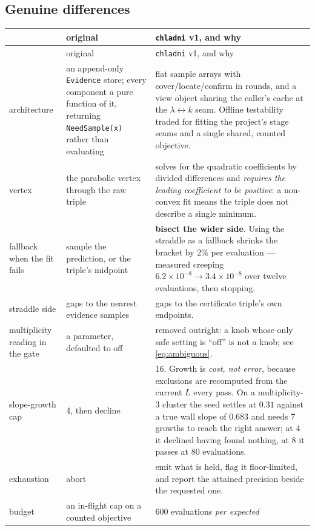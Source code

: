 \documentclass[11pt]{article}
\theoremstyle{definition}
\theoremstyle{remark}
\newcommand{\code}[1]{\texttt{#1}}
\newcommand{\lam}{\lambda}
\begin{document}
\subsection{Genuine differences}

\begin{longtable}{P{0.17\textwidth}P{0.29\textwidth}P{0.42\textwidth}}
\toprule
& original & \code{chladni} v1, and why\\
\midrule
\endfirsthead
\toprule
& original & \code{chladni} v1, and why\\
\midrule
\endhead
architecture & an append-only \code{Evidence} store; every component a pure function of it,
returning \code{NeedSample(x)} rather than evaluating &
flat sample arrays with cover/locate/confirm in rounds, and a view object sharing the caller's
cache at the $\lam\leftrightarrow k$ seam. Offline testability traded for fitting the
project's stage seams and a single shared, counted objective.\\[2pt]
vertex & the parabolic vertex through the raw triple &
solves for the quadratic coefficients by divided differences and \emph{requires the leading
coefficient to be positive}: a non-convex fit means the triple does not describe a single
minimum.\\[2pt]
fallback when the fit fails & sample the prediction, or the triple's midpoint &
\textbf{bisect the wider side}. Using the straddle as a fallback shrinks the bracket by 2\% per
evaluation --- measured creeping $6.2\times10^{-8}\to3.4\times10^{-8}$ over twelve evaluations,
then stopping.\\[2pt]
straddle side & gaps to the nearest evidence samples & gaps to the certificate triple's own
endpoints.\\[2pt]
multiplicity reading in the gate & a parameter, defaulted to off & removed outright: a knob
whose only safe setting is ``off'' is not a knob; see \eqref{eq:ambiguous}.\\[2pt]
slope-growth cap & 4, then decline & 16. Growth is \emph{cost, not error}, because exclusions
are recomputed from the current $L$ every pass. On a multiplicity-3 cluster the seed settles at
$0.31$ against a true wall slope of $0.683$ and needs 7 growths to reach the right answer; at 4
it declined having found nothing, at 8 it passes at 80 evaluations.\\[2pt]
exhaustion & abort & emit what is held, flag it floor-limited, and report the attained
precision beside the requested one.\\[2pt]
budget & an in-flight cap on a counted objective & 600 evaluations \emph{per expected
}
\end{longtable}
\end{document}
